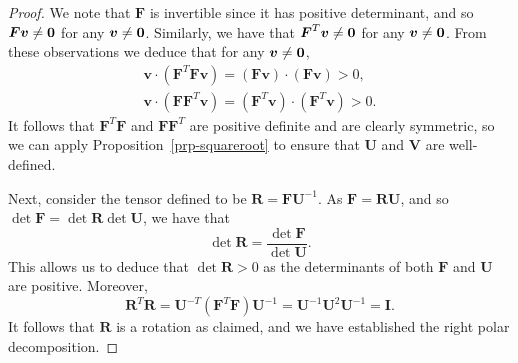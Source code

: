 \documentclass[
  letterpaper,
  DIV=11,
  numbers=noendperiod]{scrreprt}
\theoremstyle{plain}
\theoremstyle{remark}
\begin{document}
\begin{proof}
We note that \({\boldsymbol{F}}\) is invertible since it has positive
determinant, and so \({\boldsymbol{F}}{\boldsymbol{v}}\neq\bf0\) for any
\({\boldsymbol{v}}\neq\bf0\). Similarly, we have that
\({\boldsymbol{F}}^T{\boldsymbol{v}}\neq\bf0\) for any
\({\boldsymbol{v}}\neq\bf0\). From these observations we deduce that for
any \({\boldsymbol{v}}\neq\bf0\), \begin{gather*}
    {\boldsymbol{v}}\cdot({\boldsymbol{F}}^T{\boldsymbol{F}}{\boldsymbol{v}}) = ({\boldsymbol{F}}{\boldsymbol{v}})\cdot({\boldsymbol{F}}{\boldsymbol{v}})>0,\\
    {\boldsymbol{v}}\cdot({\boldsymbol{F}}{\boldsymbol{F}}^T{\boldsymbol{v}}) = ({\boldsymbol{F}}^T{\boldsymbol{v}})\cdot({\boldsymbol{F}}^T{\boldsymbol{v}})>0.
\end{gather*} It follows that \({\boldsymbol{F}}^T{\boldsymbol{F}}\) and
\({\boldsymbol{F}}{\boldsymbol{F}}^T\) are positive definite and are
clearly symmetric, so we can apply Proposition~\ref{prp-squareroot} to
ensure that \({\boldsymbol{U}}\) and \({\boldsymbol{V}}\) are
well-defined.

Next, consider the tensor defined to be
\({\boldsymbol{R}}= {\boldsymbol{F}}{\boldsymbol{U}}^{-1}\). As
\({\boldsymbol{F}}={\boldsymbol{R}}{\boldsymbol{U}}\), and so
\(\det{\boldsymbol{F}}= \det{\boldsymbol{R}}\det{\boldsymbol{U}}\), we
have that
\[\det{\boldsymbol{R}}= \frac{\det{\boldsymbol{F}}}{\det{\boldsymbol{U}}}.\]
This allows us to deduce that \(\det{\boldsymbol{R}}>0\) as the
determinants of both \({\boldsymbol{F}}\) and \({\boldsymbol{U}}\) are
positive. Moreover,
\[{\boldsymbol{R}}^T{\boldsymbol{R}}= {\boldsymbol{U}}^{-T}({\boldsymbol{F}}^T{\boldsymbol{F}}){\boldsymbol{U}}^{-1} = {\boldsymbol{U}}^{-1}{\boldsymbol{U}}^2{\boldsymbol{U}}^{-1} = {\boldsymbol{I}}.\]
It follows that \({\boldsymbol{R}}\) is a rotation as claimed, and we
have established the right polar decomposition.


\end{proof}
\end{document}
